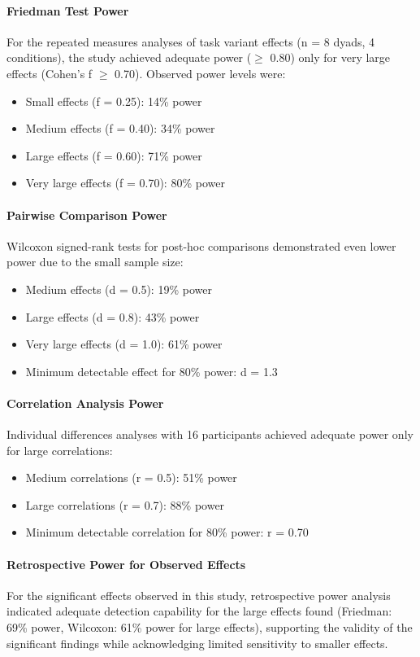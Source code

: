 \paragraph{Friedman Test Power}
For the repeated measures analyses of task variant effects (n = 8 dyads, 4 conditions), the study achieved adequate power ($\geq$ 0.80) only for very large effects (Cohen's f $\geq$ 0.70). Observed power levels were:
\begin{itemize}
\item Small effects (f = 0.25): 14\% power
\item Medium effects (f = 0.40): 34\% power  
\item Large effects (f = 0.60): 71\% power
\item Very large effects (f = 0.70): 80\% power
\end{itemize}

\paragraph{Pairwise Comparison Power}
Wilcoxon signed-rank tests for post-hoc comparisons demonstrated even lower power due to the small sample size:
\begin{itemize}
\item Medium effects (d = 0.5): 19\% power
\item Large effects (d = 0.8): 43\% power
\item Very large effects (d = 1.0): 61\% power
\item Minimum detectable effect for 80\% power: d = 1.3
\end{itemize}

\paragraph{Correlation Analysis Power}
Individual differences analyses with 16 participants achieved adequate power only for large correlations:
\begin{itemize}
\item Medium correlations (r = 0.5): 51\% power
\item Large correlations (r = 0.7): 88\% power
\item Minimum detectable correlation for 80\% power: r = 0.70
\end{itemize}

\paragraph{Retrospective Power for Observed Effects}
For the significant effects observed in this study, retrospective power analysis indicated adequate detection capability for the large effects found (Friedman: 69\% power, Wilcoxon: 61\% power for large effects), supporting the validity of the significant findings while acknowledging limited sensitivity to smaller effects.

